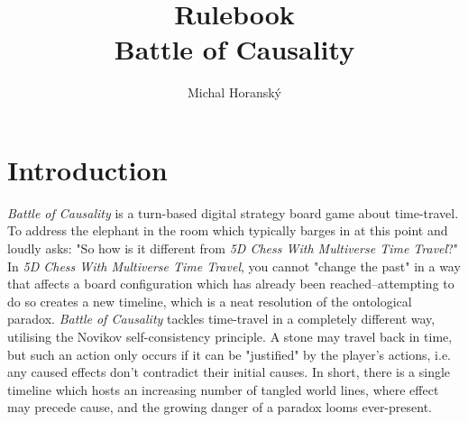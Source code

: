 \documentclass[12pt]{article}
\begin{document}
	\title{\Huge Rulebook\\\large Battle of Causality}
	\author{Michal Horanský}
	\maketitle
	
	\tableofcontents
	
	\section{Introduction}
	\textit{Battle of Causality} is a turn-based digital strategy board game about time-travel. To address the elephant in the room which typically barges in at this point and loudly asks: "So how is it different from \textit{5D Chess With Multiverse Time Travel}?" In \textit{5D Chess With Multiverse Time Travel}, you cannot "change the past" in a way that affects a board configuration which has already been reached--attempting to do so creates a new timeline, which is a neat resolution of the ontological paradox. \textit{Battle of Causality} tackles time-travel in a completely different way, utilising the Novikov self-consistency principle. A stone may travel back in time, but such an action only occurs if it can be "justified" by the player's actions, i.e. any caused effects don't contradict their initial causes. In short, there is a single timeline which hosts an increasing number of tangled world lines, where effect may precede cause, and the growing danger of a paradox looms ever-present.
	
\end{document}
